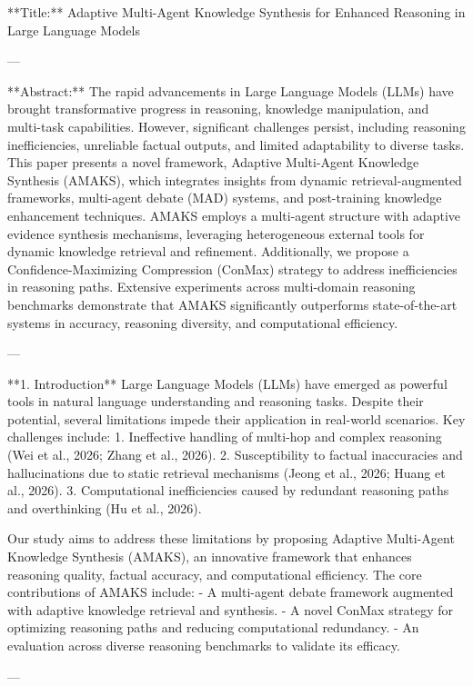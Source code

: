 **Title:** Adaptive Multi-Agent Knowledge Synthesis for Enhanced Reasoning in Large Language Models  

---

**Abstract:**  
The rapid advancements in Large Language Models (LLMs) have brought transformative progress in reasoning, knowledge manipulation, and multi-task capabilities. However, significant challenges persist, including reasoning inefficiencies, unreliable factual outputs, and limited adaptability to diverse tasks. This paper presents a novel framework, Adaptive Multi-Agent Knowledge Synthesis (AMAKS), which integrates insights from dynamic retrieval-augmented frameworks, multi-agent debate (MAD) systems, and post-training knowledge enhancement techniques. AMAKS employs a multi-agent structure with adaptive evidence synthesis mechanisms, leveraging heterogeneous external tools for dynamic knowledge retrieval and refinement. Additionally, we propose a Confidence-Maximizing Compression (ConMax) strategy to address inefficiencies in reasoning paths. Extensive experiments across multi-domain reasoning benchmarks demonstrate that AMAKS significantly outperforms state-of-the-art systems in accuracy, reasoning diversity, and computational efficiency.  

---

**1. Introduction**  
Large Language Models (LLMs) have emerged as powerful tools in natural language understanding and reasoning tasks. Despite their potential, several limitations impede their application in real-world scenarios. Key challenges include:  
1. Ineffective handling of multi-hop and complex reasoning (Wei et al., 2026; Zhang et al., 2026).  
2. Susceptibility to factual inaccuracies and hallucinations due to static retrieval mechanisms (Jeong et al., 2026; Huang et al., 2026).  
3. Computational inefficiencies caused by redundant reasoning paths and overthinking (Hu et al., 2026).  

Our study aims to address these limitations by proposing Adaptive Multi-Agent Knowledge Synthesis (AMAKS), an innovative framework that enhances reasoning quality, factual accuracy, and computational efficiency. The core contributions of AMAKS include:  
- A multi-agent debate framework augmented with adaptive knowledge retrieval and synthesis.  
- A novel ConMax strategy for optimizing reasoning paths and reducing computational redundancy.  
- An evaluation across diverse reasoning benchmarks to validate its efficacy.  

---

